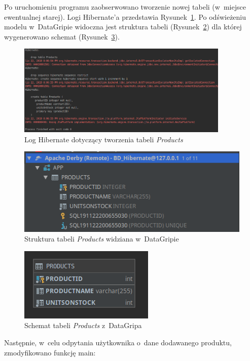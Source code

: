 \documentclass[12pt, a4paper]{mwart}
\begin{document}
Po uruchomieniu programu zaobserwowano tworzenie nowej tabeli (w~miejsce ewentualnej starej). Logi Hibernate'a przedstawia Rysunek~\ref{rys:2.1}. Po odświeżeniu modelu w~DataGripie widoczna jest struktura tabeli (Rysunek~\ref{rys:2.2}) dla której wygenerowano schemat (Rysunek~\ref{rys:2.3}).

\begin{figure}[ht]
  \centering
  \includegraphics[width=0.9\textwidth]{II/2-1.png}
  \caption{Log Hibernate dotyczący tworzenia tabeli \textit{Products}}
  \label{rys:2.1}
\end{figure}

\begin{figure}[ht]
  \centering
  \includegraphics[scale=0.5]{II/2-2.png}
  \caption{Struktura tabeli \textit{Products} widziana w~DataGripie}
  \label{rys:2.2}
\end{figure}

\begin{figure}[ht]
  \centering
  \includegraphics[scale=0.5]{II/2-3.png}
  \caption{Schemat tabeli \textit{Products} z~DataGripa}
  \label{rys:2.3}
\end{figure}

Następnie, w~celu odpytania użytkownika o~dane dodawanego produktu, zmodyfikowano funkcję main:
\end{document}
